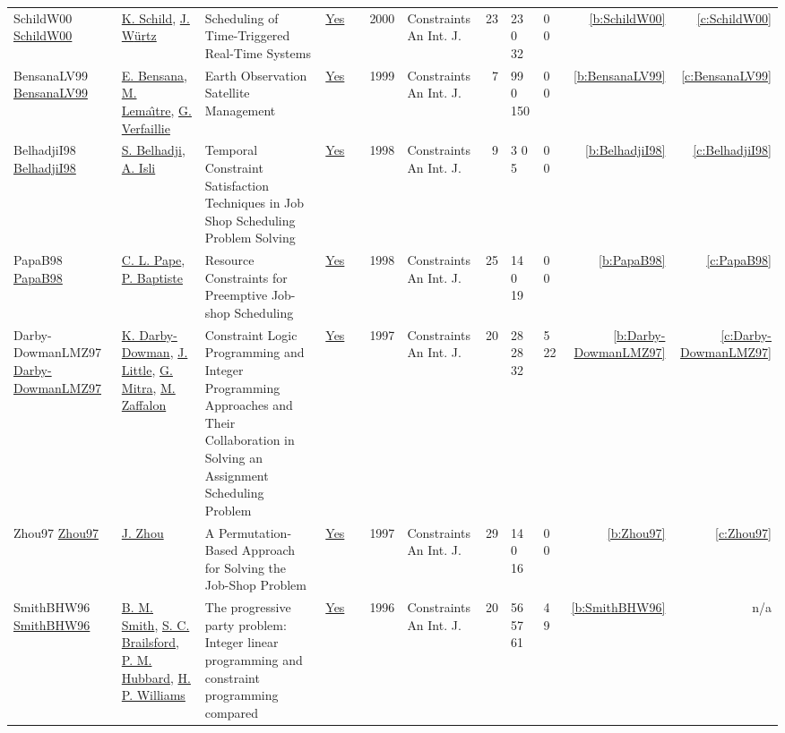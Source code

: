 {\begin{longtable}{>{\raggedright\arraybackslash}p{3cm}>{\raggedright\arraybackslash}p{4.5cm}>{\raggedright\arraybackslash}p{6.0cm}rrrp{2.5cm}rp{1cm}p{1cm}rr}
SchildW00 \href{https://doi.org/10.1023/A:1009804226473}{SchildW00} & \hyperref[auth:a164]{K. Schild}, \hyperref[auth:a165]{J. W{\"{u}}rtz} & Scheduling of Time-Triggered Real-Time Systems & \href{../works/SchildW00.pdf}{Yes} & \cite{SchildW00} & 2000 & Constraints An Int. J. & 23 & 23 0 32 & 0 0 & \ref{b:SchildW00} & \ref{c:SchildW00}\\
BensanaLV99 \href{https://doi.org/10.1023/A:1026488509554}{BensanaLV99} & \hyperref[auth:a171]{E. Bensana}, \hyperref[auth:a172]{M. Lema{\^{\i}}tre}, \hyperref[auth:a173]{G. Verfaillie} & Earth Observation Satellite Management & \href{../works/BensanaLV99.pdf}{Yes} & \cite{BensanaLV99} & 1999 & Constraints An Int. J. & 7 & 99 0 150 & 0 0 & \ref{b:BensanaLV99} & \ref{c:BensanaLV99}\\
BelhadjiI98 \href{https://doi.org/10.1023/A:1009777711218}{BelhadjiI98} & \hyperref[auth:a174]{S. Belhadji}, \hyperref[auth:a175]{A. Isli} & Temporal Constraint Satisfaction Techniques in Job Shop Scheduling Problem Solving & \href{../works/BelhadjiI98.pdf}{Yes} & \cite{BelhadjiI98} & 1998 & Constraints An Int. J. & 9 & 3 0 5 & 0 0 & \ref{b:BelhadjiI98} & \ref{c:BelhadjiI98}\\
PapaB98 \href{https://doi.org/10.1023/A:1009723704757}{PapaB98} & \hyperref[auth:a163]{C. L. Pape}, \hyperref[auth:a162]{P. Baptiste} & Resource Constraints for Preemptive Job-shop Scheduling & \href{../works/PapaB98.pdf}{Yes} & \cite{PapaB98} & 1998 & Constraints An Int. J. & 25 & 14 0 19 & 0 0 & \ref{b:PapaB98} & \ref{c:PapaB98}\\
Darby-DowmanLMZ97 \href{https://doi.org/10.1007/BF00137871}{Darby-DowmanLMZ97} & \hyperref[auth:a177]{K. Darby-Dowman}, \hyperref[auth:a178]{J. Little}, \hyperref[auth:a179]{G. Mitra}, \hyperref[auth:a180]{M. Zaffalon} & \cellcolor{green!10}Constraint Logic Programming and Integer Programming Approaches and Their Collaboration in Solving an Assignment Scheduling Problem & \href{../works/Darby-DowmanLMZ97.pdf}{Yes} & \cite{Darby-DowmanLMZ97} & 1997 & Constraints An Int. J. & 20 & 28 28 32 & 5 22 & \ref{b:Darby-DowmanLMZ97} & \ref{c:Darby-DowmanLMZ97}\\
Zhou97 \href{https://doi.org/10.1023/A:1009757726572}{Zhou97} & \hyperref[auth:a176]{J. Zhou} & A Permutation-Based Approach for Solving the Job-Shop Problem & \href{../works/Zhou97.pdf}{Yes} & \cite{Zhou97} & 1997 & Constraints An Int. J. & 29 & 14 0 16 & 0 0 & \ref{b:Zhou97} & \ref{c:Zhou97}\\
SmithBHW96 \href{http://dx.doi.org/10.1007/bf00143880}{SmithBHW96} & \hyperref[auth:a1054]{B. M. Smith}, \hyperref[auth:a1052]{S. C. Brailsford}, \hyperref[auth:a1180]{P. M. Hubbard}, \hyperref[auth:a1181]{H. P. Williams} & The progressive party problem: Integer linear programming and constraint programming compared & \href{../works/SmithBHW96.pdf}{Yes} & \cite{SmithBHW96} & 1996 & Constraints An Int. J. & 20 & 56 57 61 & 4 9 & \ref{b:SmithBHW96} & n/a\\

\end{longtable}}
